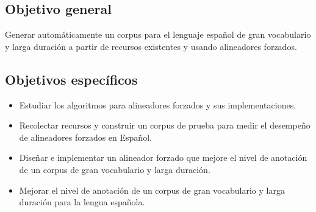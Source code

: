 \subsection{Objetivo general}

Generar automáticamente un corpus para el lenguaje español de gran vocabulario y larga duración a partir de recursos existentes y usando alineadores forzados.

\subsection{Objetivos específicos}

\begin{itemize}
    \item Estudiar los algoritmos para alineadores forzados y sus implementaciones.
    \item Recolectar recursos y construir un corpus de prueba para medir el desempeño de alineadores forzados en Español.
    \item Diseñar e implementar un alineador forzado que mejore el nivel de anotación de un corpus de gran vocabulario y larga duración.
    \item Mejorar el nivel de anotación de un corpus de gran vocabulario y larga duración para la lengua española.

\end{itemize}

